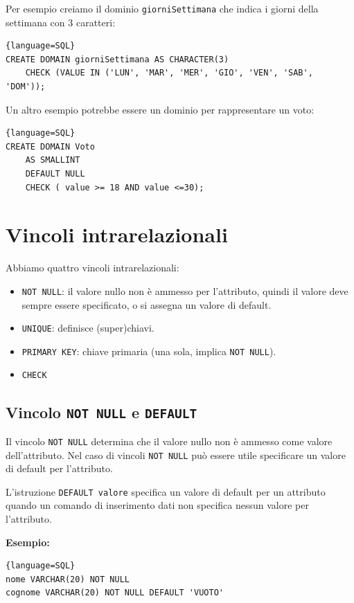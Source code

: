 \documentclass[11pt]{report}
\begin{document}
Per esempio creiamo il dominio \texttt{giorniSettimana} che indica i giorni della settimana con 3 caratteri:
\begin{lstlisting}{language=SQL}
CREATE DOMAIN giorniSettimana AS CHARACTER(3)
	CHECK (VALUE IN ('LUN', 'MAR', 'MER', 'GIO', 'VEN', 'SAB', 'DOM'));
\end{lstlisting}

Un altro esempio potrebbe essere un dominio per rappresentare un voto:
\begin{lstlisting}{language=SQL}
CREATE DOMAIN Voto
	AS SMALLINT
	DEFAULT NULL
	CHECK ( value >= 18 AND value <=30);
\end{lstlisting}

\section{Vincoli intrarelazionali}

Abbiamo quattro vincoli intrarelazionali: 
\begin{itemize}
\item \texttt{NOT NULL}: il valore nullo non \`e ammesso per l'attributo, quindi il valore deve sempre essere specificato, o si assegna un valore di default.
\item \texttt{UNIQUE}: definisce (super)chiavi.
\item \texttt{PRIMARY KEY}: chiave primaria (una sola, implica \texttt{NOT NULL}).
\item \texttt{CHECK}
\end{itemize}

\subsection{Vincolo \texttt{NOT NULL} e \texttt{DEFAULT}}

Il vincolo \texttt{NOT NULL} determina che il valore nullo non \`e ammesso come valore dell'attributo. Nel caso di vincoli \texttt{NOT NULL} pu\`o essere utile specificare un valore di default per l'attributo. 

L'istruzione \texttt{DEFAULT valore} specifica un valore di default per un attributo quando un comando di inserimento dati non specifica nessun valore per l'attributo.
\newline

\noindent\textbf{Esempio:}

\begin{lstlisting}{language=SQL}
nome VARCHAR(20) NOT NULL
cognome VARCHAR(20) NOT NULL DEFAULT 'VUOTO'
\end{lstlisting}
\end{document}
